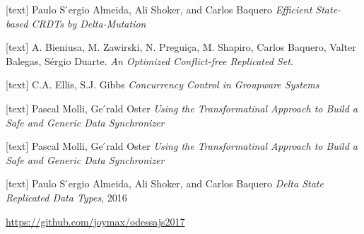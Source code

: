\documentclass{beamer}
\begin{document}
\begin{frame}
\begin{thebibliography}{99}

[text]
Paulo S ́ergio Almeida, Ali Shoker, and Carlos Baquero
\textit{Efficient State-based CRDTs by Delta-Mutation}

[text]
A. Bieniusa, M. Zawirski, N. Preguiça, M. Shapiro, Carlos Baquero, Valter Balegas, Sérgio Duarte.
\textit{An Optimized Conflict-free Replicated Set.}

[text]
C.A. Ellis, S.J. Gibbs
\textit{Concurrency Control in Groupware Systems}

[text]
Pascal Molli, Ge ́rald Oster
\textit{Using the Transformatinal Approach to Build a Safe and Generic Data Synchronizer}


[text]
Pascal Molli, Ge ́rald Oster
\textit{Using the Transformatinal Approach to Build a Safe and Generic Data Synchronizer}

[text]
Paulo S ́ergio Almeida, Ali Shoker, and Carlos Baquero
\textit{Delta State Replicated Data Types}, 2016


\end{thebibliography}	
\end{frame}



\begin{frame}

\vspace{1cm}
\begin{footnotesize}
\href{https://github.com/joymax/odessajs2017}{https://github.com/joymax/odessajs2017}
\end{footnotesize}

\end{frame}
\end{document}
